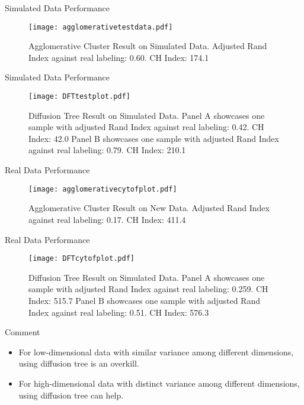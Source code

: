 \documentclass{beamer}
\begin{document}
	\begin{frame}{Simulated Data Performance}
		\begin{figure}[htbp]
			\centering
			\texttt{[image: agglomerativetestdata.pdf]}
			\caption*{Agglomerative Cluster Result on Simulated Data. Adjusted Rand Index against real labeling: 0.60. CH Index: 174.1}
		\end{figure}
	\end{frame}
	
	\begin{frame}{Simulated Data Performance}
		\begin{figure}[htbp]
			\centering
			\texttt{[image: DFTtestplot.pdf]}
			\caption*{Diffusion Tree Result on Simulated Data. Panel A showcases one sample with adjusted Rand Index against real labeling: 0.42. CH Index: 42.0 Panel B showcases one sample with adjusted Rand Index against real labeling: 0.79. CH Index: 210.1}
		\end{figure}
	\end{frame}
	
	\begin{frame}{Real Data Performance}
		\begin{figure}[htbp]
			\centering
			\texttt{[image: agglomerativecytofplot.pdf]}
			\caption*{Agglomerative Cluster Result on New Data. Adjusted Rand Index against real labeling: 0.17. CH Index: 411.4}
		\end{figure}
	\end{frame}
	
	\begin{frame}{Real Data Performance}
		\begin{figure}[htbp]
			\centering
			\texttt{[image: DFTcytofplot.pdf]}
			\caption*{Diffusion Tree Result on Simulated Data. Panel A showcases one sample with adjusted Rand Index against real labeling: 0.259. CH Index: 515.7 Panel B showcases one sample with adjusted Rand Index against real labeling: 0.51. CH Index: 576.3}
		\end{figure}
	\end{frame}
	
	\begin{frame}{Comment}
		\begin{itemize}
			\item For low-dimensional data with similar variance among different dimensions, using diffusion tree is an overkill.
			\item For high-dimensional data with distinct variance among different dimensions, using diffusion tree can help. 
		\end{itemize}
	\end{frame}
\end{document}
